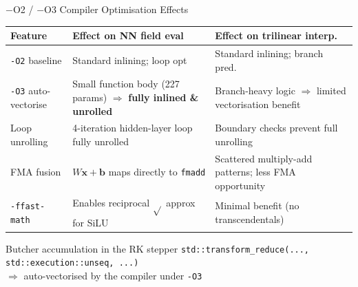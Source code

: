 \documentclass[aspectratio=169, 11pt]{beamer}
\newcommand{\bvec}[1]{\mathbf{#1}}
\begin{document}
\begin{frame}{$-$O2 / $-$O3 Compiler Optimisation Effects}

\begin{table}
\centering\small
\begin{tabular}{@{} p{2.4cm} p{4.8cm} p{4.8cm} @{}}
  \toprule
  \textbf{Feature} & \textbf{Effect on NN field eval} &
    \textbf{Effect on trilinear interp.} \\
  \midrule
  \texttt{-O2} baseline &
    Standard inlining; loop opt &
    Standard inlining; branch pred. \\[4pt]
  \texttt{-O3} auto-vectorise &
    Small function body (227 params) $\Rightarrow$ \textbf{fully inlined \&
    unrolled} &
    Branch-heavy logic $\Rightarrow$ limited vectorisation benefit \\[4pt]
  Loop unrolling &
    4-iteration hidden-layer loop fully unrolled &
    Boundary checks prevent full unrolling \\[4pt]
  FMA fusion &
    $W\bvec{x}+\bvec{b}$ maps directly to \texttt{fmadd} &
    Scattered multiply-add patterns; less FMA opportunity \\[4pt]
  \texttt{-ffast-math} &
    Enables reciprocal $\sqrt{}$ approx for SiLU &
    Minimal benefit (no transcendentals) \\
  \bottomrule
\end{tabular}
\end{table}

\vspace{6pt}
\begin{block}{Butcher accumulation in the RK stepper}
  \texttt{std::transform\_reduce(..., std::execution::unseq, ...)}\\
  $\Rightarrow$ auto-vectorised by the compiler under \texttt{-O3}
\end{block}
\end{frame}
\end{document}
